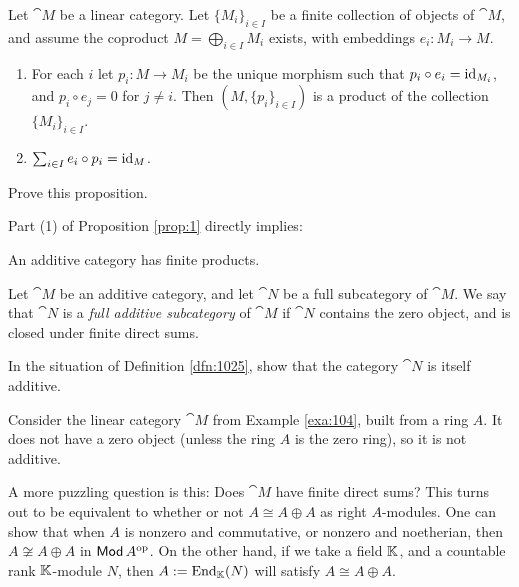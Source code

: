 \begin{prop} \label{prop:1}
Let $\cat{M}$ be a linear category. Let $\{ M_i \}_{i \in I}$ be a  
finite collection of objects of $\cat{M}$, and assume the coproduct
$M = \bigoplus_{i \in I} M_i$ exists, with embeddings 
$e_i : M_i \to M$. 

\begin{enumerate}
\item For each $i$ let $p_i : M \to M_i$ be the unique morphism 
such that $p_i \circ e_i = \operatorname{id}_{M_i}$, and 
 $p_i \circ e_j = 0$ for $j \neq i$. 
Then $(M, \{ p_i \}_{i \in I})$ is a product of the collection 
$\{ M_i \}_{i \in I}$.

\item $\sum_{i \in I} e_i \circ p_i = \operatorname{id}_M$.
\end{enumerate}
\end{prop}

\begin{exer} \label{exer:2490}
Prove this proposition.
\end{exer}

Part (1) of Proposition \ref{prop:1} directly implies:

\begin{cor} \label{cor:1030}
An additive category has finite products. 
\end{cor}

\begin{dfn} \label{dfn:1025}
Let $\cat{M}$ be an additive category, and let $\cat{N}$ be a full subcategory
of $\cat{M}$. We say that $\cat{N}$ is a {\em full additive subcategory} of
$\cat{M}$ if $\cat{N}$ contains the zero object, and is closed under finite 
direct sums.
\end{dfn}

\begin{exer}
In the situation of Definition \ref{dfn:1025}, show that the category $\cat{N}$ 
is itself additive.
\end{exer}

\begin{exa} \label{exa:1030}
Consider the linear category $\cat{M}$ from Example \ref{exa:104},
built from a ring $A$. It does not have a zero object (unless the ring $A$ is 
the zero ring), so it is not additive. 

A more puzzling question is this: Does $\cat{M}$ have finite direct 
sums? This turns out to be equivalent to whether or not $A \cong A \oplus A$ as 
right $A$-modules. 
One can show that when $A$ is nonzero and commutative, or nonzero and 
noetherian, then $A \not\cong A \oplus A$ in $\operatorname{\mathsf{Mod}} A^{\mathrm{op}}$.
On the other hand, if we take a field $\mathbb{K}$, and a countable rank $\mathbb{K}$-module
$N$, then $A := \operatorname{End}_{\mathbb{K}}(N)$ will satisfy $A \cong A \oplus A$.
\end{exa}


